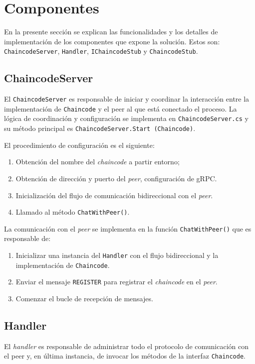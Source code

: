 \section{Componentes}\label{components}
En la presente sección se explican las funcionalidades y los detalles de implementación de los componentes que expone la solución. Estos son: \texttt{ChaincodeServer}, \texttt{Handler}, \texttt{IChaincodeStub} y \texttt{ChaincodeStub}.
\subsection{ChaincodeServer}
El \texttt{ChaincodeServer} es responsable de iniciar y coordinar la interacción entre la implementación de \texttt{Chaincode} y el peer al que está conectado el proceso. La lógica de coordinación y configuración se implementa en \texttt{ChaincodeServer.cs} y su método principal es \texttt{ChaincodeServer.Start (Chaincode)}.

El procedimiento de configuración es el siguiente:
\begin{enumerate}
\item Obtención del nombre del \textit{chaincode} a partir entorno;
\item Obtención de dirección y puerto del \textit{peer}, configuración de gRPC.
\item Inicialización del flujo de comunicación bidireccional con el \textit{peer}.
\item Llamado al método \texttt{ChatWithPeer()}.
\end{enumerate}

La comunicación con el \textit{peer} se implementa en la función \texttt{ChatWithPeer()} que es responsable de:

\begin{enumerate}
\item Inicializar una instancia del \texttt{Handler} con el flujo bidireccional y la implementación de \texttt{Chaincode}. 
\item Enviar el mensaje \texttt{REGISTER} para registrar el  \textit{chaincode} en el \textit{peer}.

\item Comenzar el bucle de recepción de mensajes.
\end{enumerate}

\subsection*{Handler}
El \textit{handler} es responsable de administrar todo el protocolo de comunicación con el peer  y, en última instancia, de invocar los métodos de la interfaz \texttt{Chaincode}.

